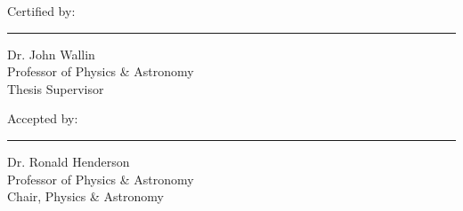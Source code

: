 \begin{flushleft}
    \fontsize{12pt}{14.4pt}\selectfont
    Certified by:
    \vspace{4pt}\hrule\vspace{4pt}
    \raggedleft
    \fontsize{10pt}{12pt}\selectfont
    Dr. John Wallin\\
    Professor of Physics \& Astronomy\\
    Thesis Supervisor\\
\end{flushleft}
\vspace{30pt}

\begin{flushleft}
    \fontsize{12pt}{14.4pt}\selectfont
    Accepted by:
    \vspace{4pt}\hrule\vspace{4pt}
    \raggedleft
    \fontsize{10pt}{12pt}\selectfont
    Dr. Ronald Henderson\\
    Professor of Physics \& Astronomy\\
    Chair, Physics \& Astronomy\\
    \vspace{36pt}
\end{flushleft}
\clearpage
\fontsize{12pt}{14.4pt}\selectfont

